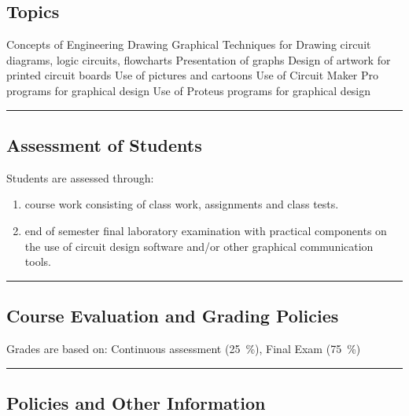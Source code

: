 \subsection*{Topics}
\begin{outline}
    \1 Concepts of Engineering Drawing
    \1 Graphical Techniques for Drawing \newline circuit diagrams, logic circuits, flowcharts
    \1 Presentation of graphs
    \1 Design of artwork for printed circuit boards
    \1 Use of pictures and cartoons
    \1 Use of Circuit Maker Pro programs for graphical design
    \1 Use of Proteus programs for graphical design
\end{outline}
\vspace{2ex} \hrule\vspace{2ex}

\subsection*{Assessment of Students}
\begin{outline}
    \1 Students are assessed through:
    \begin{enumerate}
        \item course work consisting of class work, assignments and class tests.
        \item end of semester final laboratory examination with practical components on the use of circuit design software and/or other graphical communication tools.
    \end{enumerate}

\end{outline}
\vspace{2ex}\hrule\vspace{2ex}

\subsection*{Course Evaluation and Grading Policies}
Grades are based on:
Continuous assessment (\qty{25}{\percent}),
Final Exam (\qty{75}{\percent})
\vspace{2ex}\hrule\vspace{2ex}

\subsection*{Policies and Other Information}
